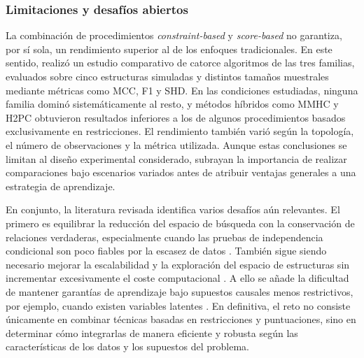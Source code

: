 \subsubsection{Limitaciones y desafíos abiertos}

La combinación de procedimientos \textit{constraint-based} y \textit{score-based} no garantiza, por sí sola, un rendimiento superior al de los enfoques tradicionales. En este sentido, \citet{Karadag2026Evaluation} realizó un estudio comparativo de catorce algoritmos de las tres familias, evaluados sobre cinco estructuras simuladas y distintos tamaños muestrales mediante métricas como MCC, F1 y SHD. En las condiciones estudiadas, ninguna familia dominó sistemáticamente al resto, y métodos híbridos como MMHC y H2PC obtuvieron resultados inferiores a los de algunos procedimientos basados exclusivamente en restricciones. El rendimiento también varió según la topología, el número de observaciones y la métrica utilizada. Aunque estas conclusiones se limitan al diseño experimental considerado, subrayan la importancia de realizar comparaciones bajo escenarios variados antes de atribuir ventajas generales a una estrategia de aprendizaje.

En conjunto, la literatura revisada identifica varios desafíos aún relevantes. El primero es equilibrar la reducción del espacio de búsqueda con la conservación de relaciones verdaderas, especialmente cuando las pruebas de independencia condicional son poco fiables por la escasez de datos \citep{Gasse2014H2PC,Nandy2018ARGES}. También sigue siendo necesario mejorar la escalabilidad y la exploración del espacio de estructuras sin incrementar excesivamente el coste computacional \citep{Wang2024ESLH,Liu2023SAPSO}. A ello se añade la dificultad de mantener garantías de aprendizaje bajo supuestos causales menos restrictivos, por ejemplo, cuando existen variables latentes \citep{Ogarrio2016GFCI,Nandy2018ARGES}. En definitiva, el reto no consiste únicamente en combinar técnicas basadas en restricciones y puntuaciones, sino en determinar cómo integrarlas de manera eficiente y robusta según las características de los datos y los supuestos del problema.